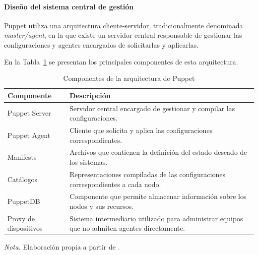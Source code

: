 \documentclass[12pt,a4paper]{article}
\begin{document}
\paragraph{Diseño del sistema central de gestión}

Puppet utiliza una arquitectura cliente-servidor, tradicionalmente
denominada \textit{master/agent}, en la que existe un servidor
central responsable de gestionar las configuraciones y agentes
encargados de solicitarlas y aplicarlas.

En la Tabla~\ref{tab:arquitectura_puppet} se presentan los
principales componentes de esta arquitectura.

\begin{table}[H]
    \centering
    \caption{Componentes de la arquitectura de Puppet}
    \label{tab:arquitectura_puppet}

    \begin{tabularx}{\textwidth}{p{}X}
        \toprule
        \textbf{Componente} & \textbf{Descripción} \\
        \midrule

        Puppet Server &
        Servidor central encargado de gestionar y compilar
        las configuraciones. \\

        Puppet Agent &
        Cliente que solicita y aplica las configuraciones
        correspondientes. \\

        Manifests &
        Archivos que contienen la definición del estado
        deseado de los sistemas. \\

        Catálogos &
        Representaciones compiladas de las configuraciones
        correspondientes a cada nodo. \\

        PuppetDB &
        Componente que permite almacenar información sobre
        los nodos y sus recursos. \\

        Proxy de dispositivos &
        Sistema intermediario utilizado para administrar
        equipos que no admiten agentes directamente. \\

        \bottomrule
    \end{tabularx}

    \vspace{0.2cm}

    {\footnotesize
    \textit{Nota.} Elaboración propia a partir de
    \parencite{puppet_documentation,puppet_device}.}
\end{table}
\end{document}
